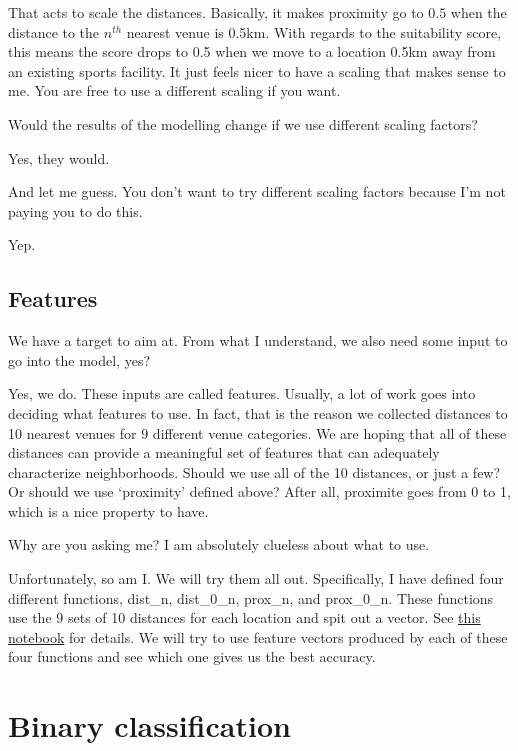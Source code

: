 That acts to scale the distances. Basically, it makes proximity go to $0.5$ when the distance to the $n^{th}$ nearest venue is 0.5km. With regards to the suitability score, this means the score drops to 0.5 when we move to a location 0.5km away from an existing sports facility. It just feels nicer to have a scaling that makes sense to me. You are free to use a different scaling if you want. 

{\color{blue} Would the results of the modelling change if we use different scaling factors?}

Yes, they would. 

{\color{blue} And let me guess. You don't want to try different scaling factors because I'm not paying you to do this.}

Yep. 


\subsection{Features}
{\color{blue} We have a target to aim at. From what I understand, we also need some input to go into the model, yes?}


Yes, we do. These inputs are called features. Usually, a lot of work goes into deciding what features to use. In fact, that is the reason we collected distances to 10 nearest venues for 9 different venue categories. We are hoping that all of these distances can provide a meaningful set of features that can adequately characterize neighborhoods. Should we use all of the 10 distances, or just a few? Or should we use `proximity' defined above? After all, proximite goes from 0 to 1, which is a nice property to have. 

{\color{blue} Why are you asking me? I am absolutely clueless about what to use.}

Unfortunately, so am I. We will try them all out. Specifically, I have defined four different functions, dist\_n, dist\_0\_n, prox\_n, and prox\_0\_n. These functions use the 9 sets of 10 distances for each location and spit out a vector. See \href{https://github.com/saba-vadarevu/IBM-dataScience-Capstone/blob/master/final/model_binary.ipynb}{this notebook} for details.  
We will try to use feature vectors produced by each of these four functions and see which one gives us the best accuracy. 


\section{Binary classification}


